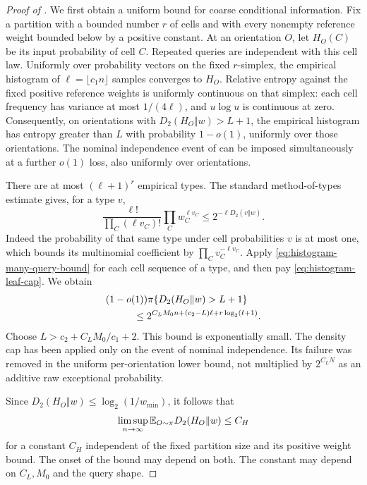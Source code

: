 \begin{proof}[Proof of ]
We first obtain a uniform bound for coarse conditional information.
Fix a partition with a bounded number $r$ of cells and with every
nonempty reference weight bounded below by a positive constant. At an
orientation $O$, let $H_O(C)$ be its input probability of cell $C$.
Repeated queries are independent with this cell law. Uniformly over
probability vectors on the fixed $r$-simplex, the empirical histogram of
$\ell=\lfloor c_1n\rfloor$ samples converges to $H_O$. Relative entropy
against the fixed positive reference weights is uniformly continuous
on that simplex: each cell frequency has variance at most $1/(4\ell)$,
and $u\log u$ is continuous at zero. Consequently, on orientations with
$D_2(H_O\Vert w)>L+1$, the empirical histogram has entropy greater
than $L$ with probability $1-o(1)$, uniformly over those orientations.
The nominal independence event of
 can be imposed simultaneously at a
further $o(1)$ loss, also uniformly over orientations.

There are at most $(\ell+1)^r$ empirical types. The standard
method-of-types estimate \citep[Theorems~11.1.1 and~11.1.4]{cover2006}
gives, for a type $v$,
\[
 \frac{\ell!}{\prod_C(\ell v_C)!}\prod_Cw_C^{\ell v_C}
 \le 2^{-\ell D_2(v\Vert w)}.
\]
Indeed the probability of that same type under cell probabilities $v$
is at most one, which bounds its multinomial coefficient by
$\prod_Cv_C^{-\ell v_C}$.
Apply \eqref{eq:histogram-many-query-bound} for each cell sequence of a
type, and then pay \eqref{eq:histogram-leaf-cap}. We obtain
\begin{align}\label{eq:histogram-entropy-tail}
 &(1-o(1))\pi\{D_2(H_O\Vert w)>L+1\}\notag\\
 &\hspace{1cm}\le
 2^{C_LM_0n+(c_2-L)\ell+r\log_2(\ell+1)}.
\end{align}
Choose $L>c_2+C_LM_0/c_1+2$. This bound is exponentially small.
The density cap has been applied only on the event of
nominal independence. Its failure was removed in the uniform
per-orientation lower bound, not multiplied by $2^{C_LN}$ as an
additive raw exceptional probability.

Since $D_2(H_O\Vert w)\le\log_2(1/w_{\min})$, it follows that
\begin{equation}\label{eq:histogram-coarse-entropy}
 \limsup_{n\to\infty}\mathbb E_{O\sim\pi}D_2(H_O\Vert w)\le C_H
\end{equation}
for a constant $C_H$ independent of the fixed partition size and its
positive weight bound. The onset of the bound may depend on both.
The constant may depend on $C_L,M_0$ and the query shape.


\end{proof}
